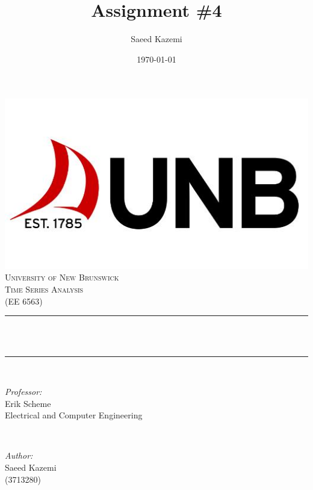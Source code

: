 \documentclass[12pt]{article}
\title{Assignment \#4}				%
\author{Saeed Kazemi}				%
\date{\today}						%
\makeatletter
\let\thedate\@date
\let\thetitle\@title
\makeatother
\begin{document}


\begin{titlepage}
	\centering
    \vspace*{0.4 cm}
    \includegraphics[scale = 0.5]{figures/unb.jpg}\\[1.0 cm]	%
    \textsc{\LARGE \newline\newline University of New Brunswick}\\[1.8 cm]	%
	\textsc{\Large Time Series Analysis\\(EE 6563)}\\[0.5 cm]				%
	\rule{\linewidth}{0.2 mm} \\[0.4 cm]
	{ \huge \bfseries \thetitle}\\
	\rule{\linewidth}{0.2 mm} \\[1.5 cm]
	
	\begin{minipage}{0.5\textwidth}
		\begin{flushleft} \large
			\emph{Professor:}\\
			Erik Scheme\\
            Electrical and Computer Engineering\\
			\end{flushleft}
			\end{minipage}~
			\begin{minipage}{0.5\textwidth}
            
			\begin{flushright} \large
			\emph{Author:} \\
			Saeed Kazemi\\ (3713280)\\

		\end{flushright}
        
	\end{minipage}\\[1 cm]
	
	
    \thedate
    
    
    
	
\end{titlepage}
\end{document}

